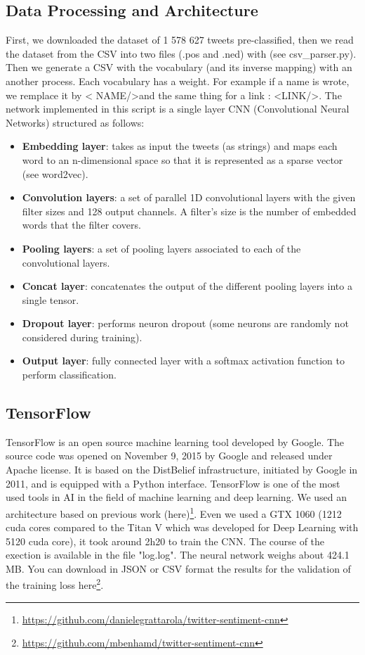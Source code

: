 \documentclass{acmtog} %
\begin{document}
\subsection{Data Processing and Architecture}
\label{subsub:dl}

First, we downloaded the dataset of 1 578 627 tweets pre-classified, then we read the dataset from the CSV into two files (.pos and .ned) with (see csv\_parser.py). Then we generate a CSV with the vocabulary (and its inverse mapping) with an another process. Each vocabulary has a weight.
For example if a name is wrote, we remplace it by \textless 
NAME/\textgreater and the same thing for a link : \textless LINK/\textgreater.
The network implemented in this script is a single layer CNN (Convolutional Neural Networks)  structured as follows:
\begin{itemize}
\item  \textbf{Embedding layer}: takes as input the tweets (as strings) and maps each word to an n-dimensional space so that it is represented as a sparse vector (see word2vec).
\item  \textbf{Convolution layers}: a set of parallel 1D convolutional layers with the given filter sizes and 128 output channels. A filter's size is the number of embedded words that the filter covers.
\item  \textbf{Pooling layers}: a set of pooling layers associated to each of the convolutional layers.
\item  \textbf{Concat layer}: concatenates the output of the different pooling layers into a single tensor.
\item  \textbf{Dropout layer}: performs neuron dropout (some neurons are randomly not considered during training).
\item  \textbf{Output layer}: fully connected layer with a softmax activation function to perform classification.
\end{itemize}

\subsection{TensorFlow}
\label{subsub:dl}

TensorFlow is an open source machine learning tool developed by Google. The source code was opened on November 9, 2015 by Google and released under Apache license.
It is based on the DistBelief infrastructure, initiated by Google in 2011, and is equipped with a Python interface.
TensorFlow is one of the most used tools in AI in the field of machine learning and deep learning.
We used an architecture based on previous work (here)\footnote{\url{https://github.com/danielegrattarola/twitter-sentiment-cnn}}.
Even we used a GTX 1060 (1212 cuda cores compared to the Titan V which was developed for Deep Learning with 5120 cuda core), it took around 2h20 to train the CNN.
The course of the exection is available in the file "log.log".
The neural network weighs about 424.1 MB.
You can download in JSON or CSV format the results for the validation of the training loss here\footnote{\url{https://github.com/mbenhamd/twitter-sentiment-cnn}}.
\end{document}
